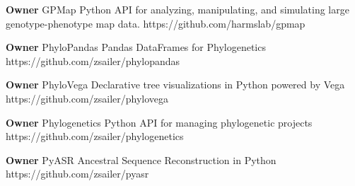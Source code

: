 \begin{cvossoftware}
  \cvoss
    {\textbf{Owner} GPMap} %
    {Python API for analyzing, manipulating, and simulating large genotype-phenotype map data.}
    {https://github.com/harmslab/gpmap} %

  \cvoss
    {\textbf{Owner} PhyloPandas} %
    {Pandas DataFrames for Phylogenetics}
    {https://github.com/zsailer/phylopandas} %

  \cvoss
    {\textbf{Owner} PhyloVega} %
    {Declarative tree visualizations in Python powered by Vega}
    {https://github.com/zsailer/phylovega} %

  \cvoss
    {\textbf{Owner} Phylogenetics} %
    {Python API for managing phylogenetic projects}
    {https://github.com/zsailer/phylogenetics} %


  \cvoss
    {\textbf{Owner} PyASR} %
    {Ancestral Sequence Reconstruction in Python}
    {https://github.com/zsailer/pyasr} %

\end{cvossoftware}
